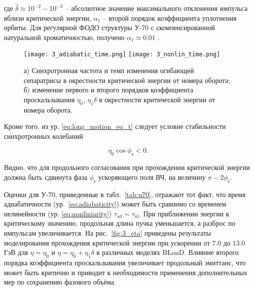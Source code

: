 \noindent где $\hat{\delta}\approx{10}^{-2}-{10}^{-3}$ -- абсолютное значение максимального отклонения импульса вблизи критической энергии, $\alpha_1$ -- второй порядок коэффициента уплотнения орбиты. Для регулярной ФОДО структуры У-70 с скомпенсированной натуральной хроматичностью, получено $\alpha_1\simeq0.01$ \cite{Kolokolchikov:2025_U70}.

\begin{figure}
   \texttt{[image: 3\_adiabatic\_time.png]}
   \texttt{[image: 3\_nonlin\_time.png]}
   \caption{а) Синхротронная частота и темп изменения огибающей сепаратрисы в окрестности критической энергии от номера оборота; б) изменение первого и второго порядков коэффициента проскальзывания $\eta_0$, $\eta_1\delta$ в окрестности критической энергии от номера оборота.}
   \label{fig:adiabatic_time_nonlin_time}
\end{figure}

\par Кроме того, из ур. \ref{eq:long_motion_eq_t} следует условие стабильности синхротронных колебаний

\begin{equation}
\eta_0\cos\phi_{\text{s}}<0.
\label{eq:long_stability}
\end{equation}

\noindent Видно, что для продольного согласования при прохождении критической энергии должна быть сдвинута фаза $\phi_{\textrm{s}}$ ускоряющего поля ВЧ, на величину $\pi-2\phi_{\textrm{s}}$.

\par Оценки для У-70, приведенные в табл.~\ref{tab:u70}, отражают тот факт, что время адиабатичности (ур.~\ref{eq:adiabaticity}) может быть сравнимо со временем нелинейности (ур. \ref{eq:nonliniarity}) $\tau_{\textrm{ad}}\sim\tau_{\textrm{nl}}$. При приближении энергии к критическому значению, продольная длина пучка уменьшается, а разброс по импульсам увеличивается. На рис.~\ref{fig:3_eta} приведены результаты моделирования прохождения критической энергии при ускорении от $7.0$ до $13.0$ ГэВ для $\eta=\eta_0$ и $\eta=\eta_0+\eta_1\delta$ в различных моделях BLonD. Влияние второго порядка коэффициента проскальзывания увеличивает продольный эмиттанс, что может быть критично и приводит к необходимости применения дополнительных мер по сохранению фазового объёма.

